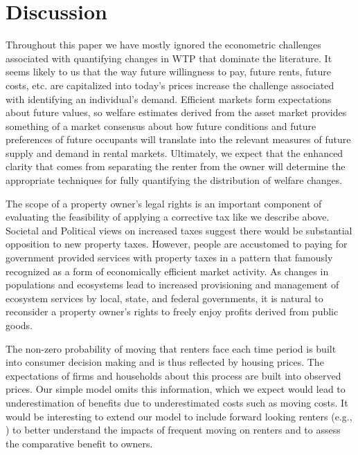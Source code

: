 \documentclass[ecta,nameyear,draft]{econsocart}
\theoremstyle{plain}
\theoremstyle{remark}
\begin{document}
\section{Discussion}
Throughout this paper we have mostly ignored the econometric challenges associated with quantifying changes in WTP that dominate the literature. It seems likely to us that the way future willingness to pay, future rents, future costs, etc. are capitalized into today's prices increase the challenge associated with identifying an individual's demand. Efficient markets form expectations about future values, so welfare estimates derived from the asset market provides something of a market consensus about how future conditions and future preferences of future occupants will translate into the relevant measures of future supply and demand in rental markets. Ultimately, we expect that the enhanced clarity that comes from separating the renter from the owner will  determine the appropriate techniques for fully quantifying the distribution of welfare changes.

The scope of a property owner's legal rights is an important component of evaluating the feasibility of applying a corrective tax like we describe above. Societal and Political views on increased taxes suggest there would be substantial opposition to new property taxes. However, people are accustomed to paying for government provided services with property taxes in a pattern that \cite{tiebout56} famously recognized as a form of economically efficient market activity. As changes in populations and ecosystems lead to increased provisioning and management of ecosystem services by local, state, and federal governments, it is natural to reconsider a property owner's rights to freely enjoy profits derived from public goods.

The non-zero probability of moving that renters face each time period is built into consumer decision making and is thus reflected by housing prices. The expectations of firms and households about this process are built into observed prices. Our simple model omits this information, which we expect would lead to underestimation of benefits due to underestimated costs such as moving costs. It would be interesting to extend our model to include forward looking renters (e.g., \cite{bishop19}) to better understand the impacts of frequent moving on renters and to assess the comparative benefit to owners.  
\end{document}
